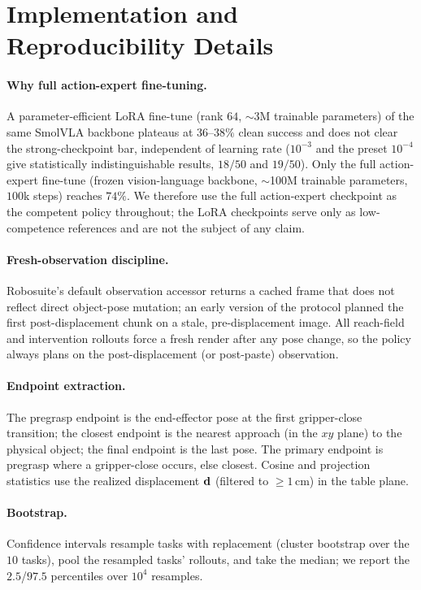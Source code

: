 \section{Implementation and Reproducibility Details}
\label{sec:appendix}

\paragraph{Why full action-expert fine-tuning.} A parameter-efficient LoRA fine-tune (rank $64$, $\sim$3M trainable parameters) of the same SmolVLA backbone plateaus at $36$--$38\%$ clean success and does not clear the strong-checkpoint bar, independent of learning rate ($10^{-3}$ and the preset $10^{-4}$ give statistically indistinguishable results, $18/50$ and $19/50$). Only the full action-expert fine-tune (frozen vision-language backbone, $\sim$100M trainable parameters, $100$k steps) reaches $74\%$. We therefore use the full action-expert checkpoint as the competent policy throughout; the LoRA checkpoints serve only as low-competence references and are not the subject of any claim.

\paragraph{Fresh-observation discipline.} Robosuite's default observation accessor returns a cached frame that does not reflect direct object-pose mutation; an early version of the protocol planned the first post-displacement chunk on a stale, pre-displacement image. All reach-field and intervention rollouts force a fresh render after any pose change, so the policy always plans on the post-displacement (or post-paste) observation.

\paragraph{Endpoint extraction.} The pregrasp endpoint is the end-effector pose at the first gripper-close transition; the closest endpoint is the nearest approach (in the $xy$ plane) to the physical object; the final endpoint is the last pose. The primary endpoint is pregrasp where a gripper-close occurs, else closest. Cosine and projection statistics use the realized displacement $\mathbf{d}$ (filtered to $\geq 1$\,cm) in the table plane.

\paragraph{Bootstrap.} Confidence intervals resample tasks with replacement (cluster bootstrap over the $10$ tasks), pool the resampled tasks' rollouts, and take the median; we report the $2.5$/$97.5$ percentiles over $10^4$ resamples.

